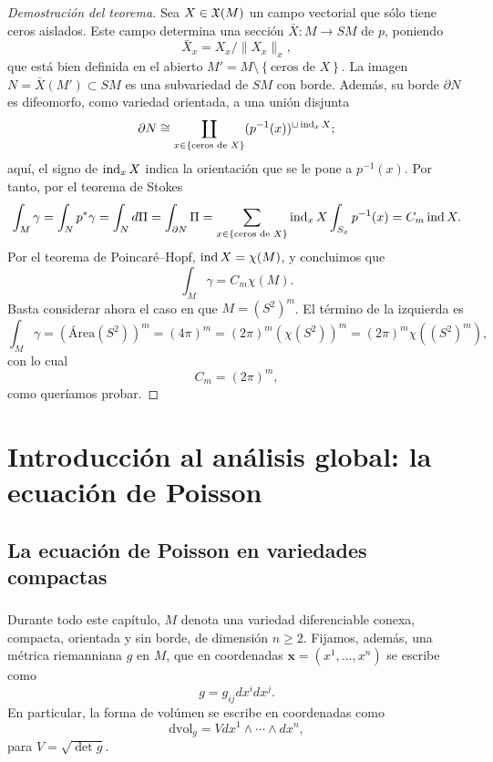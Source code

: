 \documentclass[11pt,a4paper]{amsbook}
\theoremstyle{remark} \newtheorem{rmk}[subsection]{Observación}
\theoremstyle{definition} \newtheorem{defn}[subsection]{Definición}
\theoremstyle{definition} \newtheorem{ex}[subsection]{Ejemplo}
\theoremstyle{definition} \newtheorem{ej}[subsection]{Ejercicio}
\begin{document}
\begin{proof}[Demostración del teorema]
  Sea $X\in \mathfrak X(M)$ un campo vectorial que sólo tiene ceros aislados. Este campo determina una sección $\bar{X}:M\rightarrow SM$ de $p$, poniendo \[\bar{X}_x=X_x / \lVert X_x \rVert_x,\] que está bien definida en el abierto $M'=M\setminus \left\{ \text{ceros de } X \right\}$.
  La imagen $N=\bar{X}(M')\subset SM$ es una subvariedad de $SM$ con borde. Además, su borde $\partial N$ es difeomorfo, como variedad orientada, a una unión disjunta
  \begin{equation*}
\partial N \cong \coprod_{x\in \left\{ \text{ceros de } X \right\}} (p^{-1}(x))^{\sqcup \operatorname{ind}_x X};
  \end{equation*}
  aquí, el signo de $\operatorname{ind}_x X$ indica la orientación que se le pone a $p^{-1}(x)$.
  Por tanto, por el teorema de Stokes
  \begin{equation*}
\int_M \gamma = \int_N p^*\gamma = \int_N d\Pi = \int_{\partial N} \Pi = \sum_{x\in \left\{ \text{ceros de } X \right\}} \operatorname{ind}_x X \int_{S_x}p^{-1}(x) = C_m \operatorname{ind} X.
  \end{equation*}
Por el teorema de Poincaré--Hopf, $\operatorname{ind} X = \chi(M)$, y concluimos que
\begin{equation*}
\int_M \gamma = C_m \chi(M).
\end{equation*}
Basta considerar ahora el caso en que $M=(S^2)^m$. El término de la izquierda es
\begin{equation*}
\int_M \gamma = (\text{Área}(S^2))^m = (4\pi)^m = (2\pi)^m (\chi(S^2))^m = (2\pi)^m \chi((S^2)^m),
\end{equation*}
con lo cual
\begin{equation*}
C_m = (2\pi)^m,
\end{equation*}
como queríamos probar.
\end{proof}


\chapter{Introducción al análisis global: la ecuación de Poisson}
\section{La ecuación de Poisson en variedades compactas}
\subsection{} Durante todo este capítulo, $M$ denota una variedad diferenciable conexa, compacta, orientada y sin borde, de dimensión $n\geq 2$. Fijamos, además, una métrica riemanniana $g$ en $M$, que en coordenadas $\bm{x}=(x^1,\dots,x^n)$ se escribe como
\begin{equation*}
g = g_{ij} dx^i dx^j.
\end{equation*}
En particular, la forma de volúmen se escribe en coordenadas como
\begin{equation*}
\mathrm{dvol}_g = V dx^1\wedge \cdots \wedge dx^n,
\end{equation*}
para $V=\sqrt{\det g}$.
\end{document}
